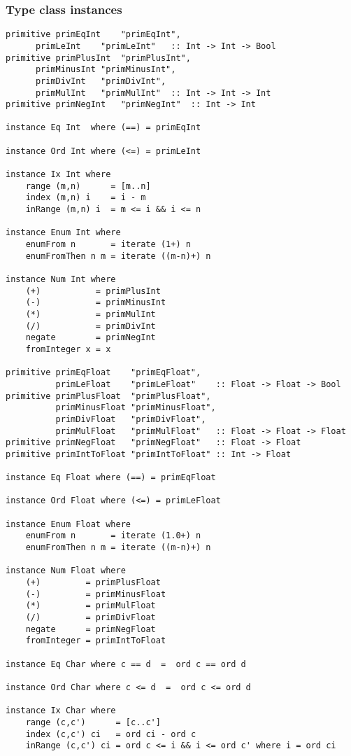 \subsubsection*{Type class instances}
\begin{verbatim}
primitive primEqInt    "primEqInt",
	  primLeInt    "primLeInt"   :: Int -> Int -> Bool
primitive primPlusInt  "primPlusInt",
	  primMinusInt "primMinusInt",
	  primDivInt   "primDivInt",
	  primMulInt   "primMulInt"  :: Int -> Int -> Int
primitive primNegInt   "primNegInt"  :: Int -> Int

instance Eq Int  where (==) = primEqInt

instance Ord Int where (<=) = primLeInt

instance Ix Int where
    range (m,n)      = [m..n]
    index (m,n) i    = i - m
    inRange (m,n) i  = m <= i && i <= n

instance Enum Int where
    enumFrom n       = iterate (1+) n
    enumFromThen n m = iterate ((m-n)+) n

instance Num Int where
    (+)           = primPlusInt
    (-)           = primMinusInt
    (*)           = primMulInt
    (/)           = primDivInt
    negate        = primNegInt
    fromInteger x = x

primitive primEqFloat    "primEqFloat",
          primLeFloat    "primLeFloat"    :: Float -> Float -> Bool
primitive primPlusFloat  "primPlusFloat", 
          primMinusFloat "primMinusFloat", 
          primDivFloat   "primDivFloat",
          primMulFloat   "primMulFloat"   :: Float -> Float -> Float 
primitive primNegFloat   "primNegFloat"   :: Float -> Float
primitive primIntToFloat "primIntToFloat" :: Int -> Float

instance Eq Float where (==) = primEqFloat

instance Ord Float where (<=) = primLeFloat

instance Enum Float where
    enumFrom n       = iterate (1.0+) n
    enumFromThen n m = iterate ((m-n)+) n

instance Num Float where
    (+)         = primPlusFloat
    (-)         = primMinusFloat
    (*)         = primMulFloat
    (/)         = primDivFloat 
    negate      = primNegFloat
    fromInteger = primIntToFloat

instance Eq Char where c == d  =  ord c == ord d

instance Ord Char where c <= d  =  ord c <= ord d

instance Ix Char where
    range (c,c')      = [c..c']
    index (c,c') ci   = ord ci - ord c
    inRange (c,c') ci = ord c <= i && i <= ord c' where i = ord ci


\end{verbatim}
